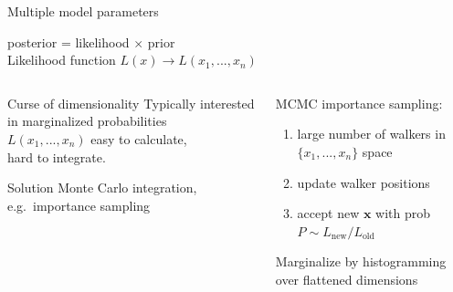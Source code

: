 \documentclass{beamer}
\begin{document}
\begin{frame}{Multiple model parameters}
  \begin{center}
    {\large posterior = likelihood $\times$ prior}\\[1ex]
    Likelihood function $L(x) \rightarrow L(x_1, ...,x_n)$
  \end{center}
  \vspace{-2ex}
  \begin{columns}[t]
    \begin{column}{0.5\textwidth}
      \begin{block}{Curse of dimensionality}
        Typically interested in marginalized probabilities\\[1ex]
        $L(x_1,...,x_n)$ easy to calculate,\\
        hard to integrate.
      \end{block}

      \begin{block}{Solution}
        Monte Carlo integration,
        e.g.\ importance sampling
      \end{block}
    \end{column}
    \vline
    \begin{column}{0.5\textwidth}
      \begin{center}
        {\color{theme} MCMC importance sampling:}\\[1ex]
        \begin{enumerate}
          \item large number of walkers in $\{x_1,...,x_n\}$ space
          \item update walker positions
          \item accept new $\mathbf x$ with prob\\
            $P \sim L_\text{new} / L_\text{old}$
        \end{enumerate}
        Marginalize by histogramming over flattened dimensions
      \end{center}
    \end{column}
  \end{columns}
\end{frame}
\end{document}
